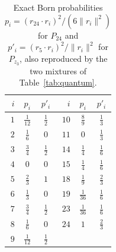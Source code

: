 \documentclass[aps,pra,reprint,superscriptaddress,longbibliography,nofootinbib,floatfix,10pt]{revtex4-2}
\theoremstyle{definition}
\begin{document}
\begin{table}[t]\centering\small\setlength{\tabcolsep}{7pt}\renewcommand{\arraystretch}{1.3}
\caption{Exact Born probabilities $p_i=(r_{24}\cdot r_i)^2/(6\|r_i\|^2)$ for $P_{24}$ and $p'_i=(r_5\cdot r_i)^2/\|r_i\|^2$ for $P_{z_3}$, also reproduced by the two mixtures of Table~\ref{tab:quantum}.}\label{tab:quantum-probabilities}
\begin{tabular}{rccrcc}\toprule
$i$ & $p_i$ & $p'_i$ & $i$ & $p_i$ & $p'_i$\\\midrule
$1$ & $\frac{1}{12}$ & $\frac{1}{2}$ & $10$ & $\frac{8}{9}$ & $\frac{1}{3}$\\
$2$ & $\frac{1}{6}$ & $0$ & $11$ & $0$ & $\frac{1}{3}$\\
$3$ & $\frac{3}{4}$ & $\frac{1}{2}$ & $14$ & $\frac{1}{4}$ & $\frac{1}{6}$\\
$4$ & $0$ & $0$ & $15$ & $\frac{1}{4}$ & $\frac{1}{6}$\\
$5$ & $\frac{2}{3}$ & $1$ & $18$ & $\frac{1}{9}$ & $\frac{2}{3}$\\
$6$ & $\frac{1}{3}$ & $0$ & $19$ & $\frac{1}{36}$ & $\frac{1}{6}$\\
$7$ & $\frac{3}{4}$ & $\frac{1}{2}$ & $23$ & $\frac{1}{36}$ & $\frac{1}{6}$\\
$8$ & $\frac{1}{6}$ & $0$ & $24$ & $1$ & $\frac{2}{3}$\\
$9$ & $\frac{1}{12}$ & $\frac{1}{2}$ & & & \\
\bottomrule\end{tabular}\end{table}

\FloatBarrier
\end{document}
